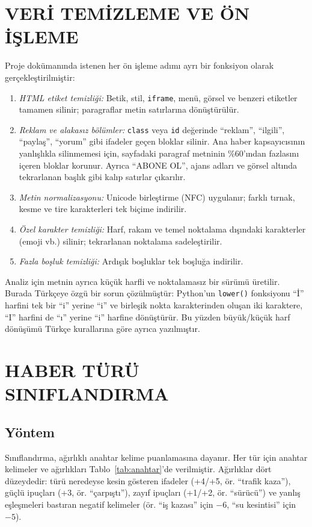 \documentclass[conference,a4paper]{IEEEtran}
\begin{document}
\section{VERİ TEMİZLEME VE ÖN İŞLEME}
Proje dokümanında istenen her ön işleme adımı ayrı bir fonksiyon olarak
gerçekleştirilmiştir:
\begin{enumerate}
\item \emph{HTML etiket temizliği:} Betik, stil, \texttt{iframe}, menü, görsel ve
benzeri etiketler tamamen silinir; paragraflar metin satırlarına dönüştürülür.
\item \emph{Reklam ve alakasız bölümler:} \texttt{class} veya \texttt{id}
değerinde ``reklam'', ``ilgili'', ``paylaş'', ``yorum'' gibi ifadeler geçen
bloklar silinir. Ana haber kapsayıcısının yanlışlıkla silinmemesi için, sayfadaki
paragraf metninin \%60'ından fazlasını içeren bloklar korunur. Ayrıca ``ABONE OL'',
ajans adları ve görsel altında tekrarlanan başlık gibi kalıp satırlar çıkarılır.
\item \emph{Metin normalizasyonu:} Unicode birleştirme (NFC) uygulanır; farklı
tırnak, kesme ve tire karakterleri tek biçime indirilir.
\item \emph{Özel karakter temizliği:} Harf, rakam ve temel noktalama dışındaki
karakterler (emoji vb.) silinir; tekrarlanan noktalama sadeleştirilir.
\item \emph{Fazla boşluk temizliği:} Ardışık boşluklar tek boşluğa indirilir.
\end{enumerate}

Analiz için metnin ayrıca küçük harfli ve noktalamasız bir sürümü üretilir.
Burada Türkçeye özgü bir sorun çözülmüştür: Python'un \texttt{lower()}
fonksiyonu ``İ'' harfini tek bir ``i'' yerine ``i'' ve birleşik nokta
karakterinden oluşan iki karaktere, ``I'' harfini de ``ı'' yerine ``i'' harfine
dönüştürür. Bu yüzden büyük/küçük harf
dönüşümü Türkçe kurallarına göre ayrıca yazılmıştır.

\section{HABER TÜRÜ SINIFLANDIRMA}

\subsection{Yöntem}
Sınıflandırma, ağırlıklı anahtar kelime puanlamasına dayanır. Her tür için
anahtar kelimeler ve ağırlıkları Tablo~\ref{tab:anahtar}'de verilmiştir.
Ağırlıklar dört düzeydedir: türü neredeyse kesin gösteren ifadeler (+4/+5,
ör. ``trafik kaza''), güçlü ipuçları (+3, ör. ``çarpıştı''), zayıf ipuçları
(+1/+2, ör. ``sürücü'') ve yanlış eşleşmeleri bastıran negatif kelimeler (ör.
``iş kazası'' için $-6$, ``su kesintisi'' için $-5$).
\end{document}
